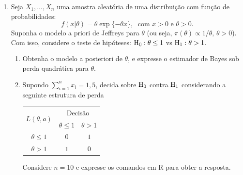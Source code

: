 \documentclass[11pt,a4]{article}\usepackage[]{graphicx}\usepackage[]{xcolor}
\begin{document}
\begin{enumerate}
\begin{solucao}
\end{solucao}

\item Seja $X_1, \ldots, X_n$ uma amostra aleatória de uma distribuição com função de probabilidades:
\[ f(x|\theta) = \theta \exp\{-\theta x\},\;\mbox{ com  } x > 0\mbox{  e  } \theta > 0.  \]
Suponha o modelo a priori de Jeffreys para $\theta$ (ou seja, $\pi (\theta) \propto 1/\theta,\,\theta > 0$). Com isso, considere o teste de hipóteses: ${\rm H_0}: \theta \leq 1$ vs ${\rm H_1}: \theta > 1$.
\begin{enumerate}
\item Obtenha o modelo a posteriori de $\theta$, e expresse o
  estimador de Bayes sob perda quadrática para $\theta$.
\item Supondo $\sum_{i=1}^{n} x_i = 1,5$, decida sobre ${\rm H_0}$ contra ${\rm H_1}$ considerando a seguinte estrutura de perda
  \begin{table}[!htb]
    \centering
    \begin{tabular}{c|cc}
      \hline
      \multirow{2}{*}{$L(\theta, a)$}& \multicolumn{2}{c}{Decisão} \\
                                     & $\theta \leq 1$ & $\theta > 1$ \\
      \hline
      $\theta \leq 1$& 0 & $1$ \\
      $\theta > 1$& $ 1 $& 0 \\
      \hline
    \end{tabular}
  \end{table}

  Considere $n=10$ e expresse os comandos em R para obter a resposta.


\end{enumerate}


\end{enumerate}
\end{document}
